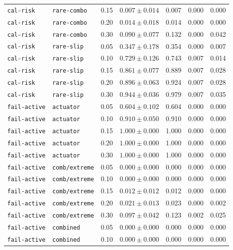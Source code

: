 \documentclass{article}
\begin{document}
\begin{center}
\begin{tabular}{lllcccc}
\texttt{cal-risk} & \texttt{rare-combo} & 0.15 & $0.007 \pm 0.014$ & 0.007 & 0.000 & 0.000 \\
\texttt{cal-risk} & \texttt{rare-combo} & 0.20 & $0.014 \pm 0.018$ & 0.014 & 0.000 & 0.000 \\
\texttt{cal-risk} & \texttt{rare-combo} & 0.30 & $0.090 \pm 0.077$ & 0.132 & 0.000 & 0.042 \\
\texttt{cal-risk} & \texttt{rare-slip} & 0.05 & $0.347 \pm 0.178$ & 0.354 & 0.000 & 0.007 \\
\texttt{cal-risk} & \texttt{rare-slip} & 0.10 & $0.729 \pm 0.126$ & 0.743 & 0.007 & 0.014 \\
\texttt{cal-risk} & \texttt{rare-slip} & 0.15 & $0.861 \pm 0.077$ & 0.889 & 0.007 & 0.028 \\
\texttt{cal-risk} & \texttt{rare-slip} & 0.20 & $0.896 \pm 0.063$ & 0.924 & 0.007 & 0.028 \\
\texttt{cal-risk} & \texttt{rare-slip} & 0.30 & $0.944 \pm 0.036$ & 0.979 & 0.007 & 0.035 \\
\texttt{fail-active} & \texttt{actuator} & 0.05 & $0.604 \pm 0.102$ & 0.604 & 0.000 & 0.000 \\
\texttt{fail-active} & \texttt{actuator} & 0.10 & $0.910 \pm 0.050$ & 0.910 & 0.000 & 0.000 \\
\texttt{fail-active} & \texttt{actuator} & 0.15 & $1.000 \pm 0.000$ & 1.000 & 0.000 & 0.000 \\
\texttt{fail-active} & \texttt{actuator} & 0.20 & $1.000 \pm 0.000$ & 1.000 & 0.000 & 0.000 \\
\texttt{fail-active} & \texttt{actuator} & 0.30 & $1.000 \pm 0.000$ & 1.000 & 0.000 & 0.000 \\
\texttt{fail-active} & \texttt{comb/extreme} & 0.05 & $0.000 \pm 0.000$ & 0.000 & 0.000 & 0.000 \\
\texttt{fail-active} & \texttt{comb/extreme} & 0.10 & $0.000 \pm 0.000$ & 0.000 & 0.000 & 0.000 \\
\texttt{fail-active} & \texttt{comb/extreme} & 0.15 & $0.012 \pm 0.012$ & 0.012 & 0.000 & 0.000 \\
\texttt{fail-active} & \texttt{comb/extreme} & 0.20 & $0.021 \pm 0.013$ & 0.023 & 0.000 & 0.002 \\
\texttt{fail-active} & \texttt{comb/extreme} & 0.30 & $0.097 \pm 0.042$ & 0.123 & 0.002 & 0.025 \\
\texttt{fail-active} & \texttt{combined} & 0.05 & $0.000 \pm 0.000$ & 0.000 & 0.000 & 0.000 \\
\texttt{fail-active} & \texttt{combined} & 0.10 & $0.000 \pm 0.000$ & 0.000 & 0.000 & 0.000 \\

\end{tabular}
\end{center}
\end{document}

